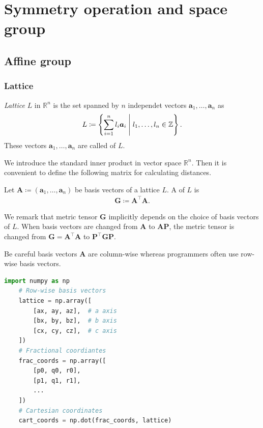 \section{\label{sec:operation}Symmetry operation and space group}

\subsection{Affine group}

\subsubsection{Lattice}

\begin{screen}
  \begin{defn}[lattice]
    \textit{Lattice} $L$ in $\mathbb{R}^{n}$ is the set spanned by $n$ independet vectors $\bm{a}_{1}, \dots, \bm{a}_{n}$ as
    \begin{align}
      L \coloneqq \left\{  \sum_{i=1}^{n} l_{i} \bm{a}_{i}  \mathrel{}\middle|\mathrel{}  l_{1}, \dots, l_{n} \in \mathbb{Z}  \right\}.
    \end{align}
    These vectors $\bm{a}_{1}, \dots, \bm{a}_{n}$ are called  of $L$.
  \end{defn}
\end{screen}

We introduce the standard inner product in vector space $\mathbb{R}^{n}$.
Then it is convenient to define the following matrix for calculating distances.

\begin{screen}
  \begin{defn}
    Let $\mathbf{A} \coloneqq ( \mathbf{a}_{1}, \dots, \mathbf{a}_{n} )$ be basis vectors of a lattice $L$.
    A  of $L$ is
    \begin{align}
      \bm{G} \coloneqq \bm{A}^{\top} \bm{A}.
    \end{align}
  \end{defn}
\end{screen}

We remark that metric tensor $\bm{G}$ implicitly depends on the choice of basis vectors of $L$.
When basis vectors are changed from $\bm{A}$ to $\bm{AP}$, the metric tensor is changed from $ \bm{G} = \bm{A}^{\top} \bm{A}$ to $\bm{P}^{\top} \bm{GP}$.

Be careful basis vectors $\bm{A}$ are column-wise whereas programmers often use row-wise basis vectors.
\begin{lstlisting}[language=Python]
    import numpy as np
    # Row-wise basis vectors
    lattice = np.array([
        [ax, ay, az],  # a axis
        [bx, by, bz],  # b axis
        [cx, cy, cz],  # c axis
    ])
    # Fractional coordiantes
    frac_coords = np.array([
        [p0, q0, r0],
        [p1, q1, r1],
        ...
    ])
    # Cartesian coordinates
    cart_coords = np.dot(frac_coords, lattice)
\end{lstlisting}

